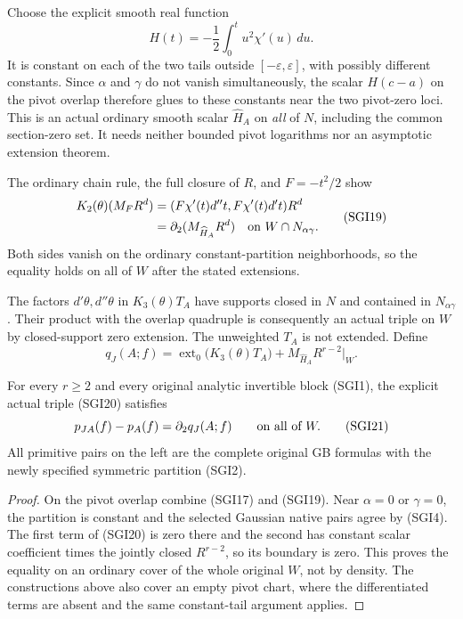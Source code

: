 Choose the explicit smooth real function
\[
       H(t)=-\frac12\int_0^t u^2\chi'(u)\,du.
 \tag{SGI18}
\]
It is constant on each of the two tails outside
$[-\varepsilon,\varepsilon]$, with possibly different constants.
Since $\alpha$ and $\gamma$ do not vanish simultaneously, the
scalar $H(c-a)$ on the pivot overlap therefore glues to these
constants near the two pivot-zero loci.  This is an actual ordinary
smooth scalar $\widehat H_A$ on \emph{all} of $N$, including the
common section-zero set.  It needs neither bounded pivot logarithms
nor an asymptotic extension theorem.

The ordinary chain rule, the full closure of $R$, and
$F=-t^2/2$ show
\[
 \begin{split}
 K_2(\theta)(M_F R^d)
   &=(F\chi'(t)d''t,F\chi'(t)d't)R^d\\
   &=\partial_2(M_{\widehat H_A}R^d)
                        \quad\hbox{on }W\cap N_{\alpha\gamma}.
 \end{split}
 \tag{SGI19}
\]
Both sides vanish on the ordinary constant-partition neighborhoods,
so the equality holds on all of $W$ after the stated extensions.

The factors $d'\theta,d''\theta$ in $K_3(\theta)T_A$ have
supports closed in $N$ and contained in $N_{\alpha\gamma}$.
Their product with the overlap quadruple is consequently an actual
triple on $W$ by closed-support zero extension.  The unweighted
$T_A$ is not extended.  Define
\[
 \boxed{\quad
 q_J(A;f)=\operatorname{ext}_0\bigl(K_3(\theta)T_A\bigr)
                         +M_{\widehat H_A}R^{r-2}\big|_W.
 \quad}
 \tag{SGI20}
\]

\begin{theorem}
For every $r\ge2$ and every original analytic invertible block
(SGI1), the explicit actual triple (SGI20) satisfies
\[
                         p_{JA}(f)-p_A(f)=\partial_2q_J(A;f)
                         \qquad\hbox{on all of }W.
 \tag{SGI21}
\]
All primitive pairs on the left are the complete original GB
formulas with the newly specified symmetric partition (SGI2).
\end{theorem}

\begin{proof}
On the pivot overlap combine (SGI17) and (SGI19).
Near $\alpha=0$ or $\gamma=0$, the partition is constant and the
selected Gaussian native pairs agree by (SGI4).  The first term
of (SGI20) is zero there and the second has constant scalar
coefficient times the jointly closed $R^{r-2}$, so its boundary
is zero.  This proves the equality on an ordinary cover of the
whole original $W$, not by density.  The constructions above
also cover an empty pivot chart, where the differentiated terms
are absent and the same constant-tail argument applies.
\end{proof}

